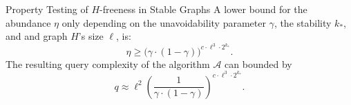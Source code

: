 \documentclass{beamer}
\newcommand{\Parcurly}[1]{\left\{ #1 \right\}}
\newcommand{\Parround}[1]{\left( #1 \right)}
\newcommand{\parround}[1]{( #1 )}
\newcommand{\bparround}[1]{\bigl( #1 \bigr)}
\begin{document}
\begin{frame}{Property Testing of $H$-freeness in Stable Graphs}
    \footnotesize
     {
        A lower bound for the abundance $\eta$ only depending on the unavoidability parameter $\gamma$, the stability $k_*$, and
        and graph $H$'s size $\ell$, is:
        \[
            \eta \geq \bparround{\gamma \cdot (1 - \gamma)} ^ {c \cdot \ell^3 \cdot 2^{k_*}}.
        \]
    }
     {
        The resulting query complexity of the algorithm $\mathcal{A}$ can bounded by
        \[
            q \approx \ell^2 \Parround{\frac{1}{{\gamma \cdot (1 - \gamma)}}}^{c \cdot \ell^3 \cdot 2^{k_*}}.
        \]
    }
\end{frame}

\end{document}
